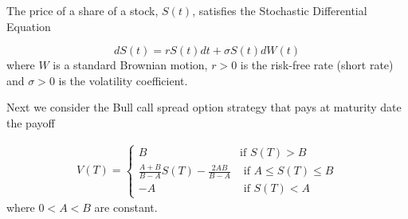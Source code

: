 \documentclass[12pt,twoside, letter]{exam}
\theoremstyle{definition}
\begin{document}
    \par{The price of a share of a stock, $S(t)$, satisfies the Stochastic Differential Equation}

    \begin{equation*}
      dS(t) = rS(t)dt + \sigma S(t)dW(t)
    \end{equation*}
    where $W$ is a standard Brownian motion, $r > 0$ is the risk-free rate (short rate) and $\sigma > 0$ is the volatility coefficient.
    \par{ Next we consider the Bull call spread option strategy that pays at maturity date the payoff}

    \begin{align*}
      V(T) =
      \begin{cases}
        B & \text{if $S(T) > B$} \\
        \frac{A+B}{B-A}S(T) - \frac{2AB}{B-A} & \text{ if $A \leq S(T) \leq B$} \\
        -A & \text{ if $S(T) < A$}
      \end{cases}
    \end{align*}
    where $0 < A < B$ are constant.
\end{document}
